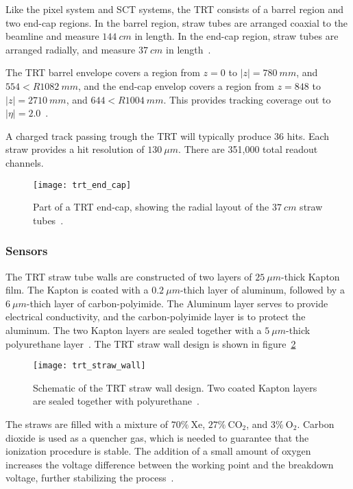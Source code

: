 Like the pixel system and SCT systems, the TRT consists of a barrel region and two end-cap regions.
In the barrel region, straw tubes are arranged coaxial to the beamline and measure $144~cm$ in length.
In the end-cap region, straw tubes are arranged radially, and measure $37~cm$ in length~\cite{atlas-detector-2008}.

The TRT barrel envelope covers a region from $z = 0$ to $|z|  = 780~mm$, and $554 < R 1082~mm$,
and the end-cap envelop covers a region from $z = 848$ to $|z|  = 2710~mm$, and $644 < R 1004~mm$.
This provides tracking coverage out to $|\eta| = 2.0$~\cite{atlas-detector-2008}.

A charged track passing trough the TRT will typically produce 36 hits.
Each straw provides a hit resolution of $130~\mu m$.
There are 351,000 total readout channels.

\begin{figure}[!ht]\centering
\texttt{[image: trt\_end\_cap]}
\caption{Part of a TRT end-cap, showing the radial layout of the $37~cm$ straw tubes~\cite{trt-2013}.}
\label{fig:trt_end_cap}
\end{figure}

\subsubsection{Sensors}

The TRT straw tube walls are constructed of two layers of $25~\mu m$-thick Kapton film.
The Kapton is coated with a $0.2~\mu m$-thich layer of aluminum, followed by a $6~\mu m$-thich layer of carbon-polyimide.
The Aluminum layer serves to provide electrical conductivity, and the carbon-polyimide layer is to protect the aluminum.
The two Kapton layers are sealed together with a $5~\mu m$-thick polyurethane layer~\cite{trt-2013}.
The TRT straw wall design is shown in figure~\ref{fig:trt_straw_wall}

\begin{figure}[!ht]\centering
\texttt{[image: trt\_straw\_wall]}
\caption{Schematic of the TRT straw wall design. Two coated Kapton layers are sealed together with polyurethane~\cite{trt-2013}.}
\label{fig:trt_straw_wall}
\end{figure}

The straws are filled with a mixture of $70\%~\mathrm{Xe}$, $27\%~\mathrm{CO_2}$,
and $3\%~\mathrm{O_2}$.
Carbon dioxide is used as a quencher gas, which is needed to guarantee that the ionization procedure is stable.
The addition of a small amount of oxygen increases the voltage difference between the working point and the breakdown voltage,
further stabilizing the process~\cite{trt-2013}.


